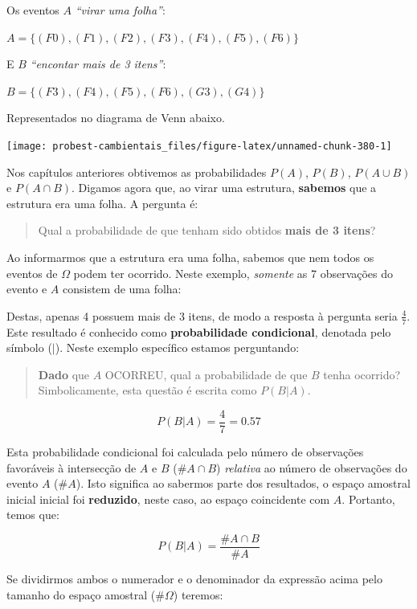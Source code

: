 \documentclass[
]{book}
\begin{document}
Os eventos \(A\) \emph{``virar uma folha''}:

\(A = \{(F0), (F1), (F2), (F3), (F4), (F5), (F6)\}\)

E \(B\) \emph{``encontar mais de 3 itens''}:

\(B = \{(F3), (F4), (F5), (F6), (G3), (G4)\}\)

Representados no diagrama de Venn abaixo.

\begin{center}\texttt{[image: probest-cambientais\_files/figure-latex/unnamed-chunk-380-1]} \end{center}

Nos capítulos anteriores obtivemos as probabilidades \(P(A)\), \(P(B)\), \(P(A \cup B)\) e \(P(A \cap B)\). Digamos agora que, ao virar uma estrutura, \textbf{sabemos} que a estrutura era uma folha. A pergunta é:

\begin{quote}
Qual a probabilidade de que tenham sido obtidos \textbf{mais de 3 itens}?
\end{quote}

Ao informarmos que a estrutura era uma folha, sabemos que nem todos os eventos de \(\Omega\) podem ter ocorrido. Neste exemplo, \emph{somente} as 7 observações do evento e \(A\) consistem de uma folha:

Destas, apenas 4 possuem mais de 3 itens, de modo a resposta à pergunta seria \(\frac{4}{7}\). Este resultado é conhecido como \textbf{probabilidade condicional}, denotada pelo símbolo (\(|\)). Neste exemplo específico estamos perguntando:

\begin{quote}
\textbf{Dado} que \(A\) OCORREU, qual a probabilidade de que \(B\) tenha ocorrido? Simbolicamente, esta questão é escrita como \(P(B|A)\).
\end{quote}

\[P(B|A) = \frac{4}{7} = 0.57\]

Esta probabilidade condicional foi calculada pelo número de observações favoráveis à intersecção de \(A\) e \(B\) (\(\#A \cap B\)) \emph{relativa} ao número de observações do evento \(A\) (\(\#A\)). Isto significa ao sabermos parte dos resultados, o espaço amostral inicial inicial foi \textbf{reduzido}, neste caso, ao espaço coincidente com \(A\). Portanto, temos que:

\[P(B|A) = \frac{\#A \cap B}{\#A}\]

Se dividirmos ambos o numerador e o denominador da expressão acima pelo tamanho do espaço amostral (\(\#\Omega\)) teremos:
\end{document}
